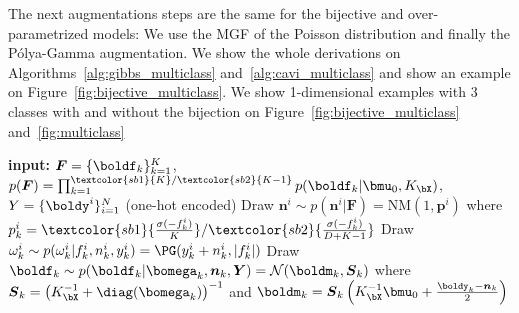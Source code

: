 The next augmentations steps are the same for the bijective and over-parametrized models:
We use the \ac{MGF} of the Poisson distribution and finally the P\'olya-Gamma augmentation.
We show the whole derivations on Algorithms~\ref{alg:gibbs_multiclass} and~\ref{alg:cavi_multiclass} and show an example on Figure~\ref{fig:bijective_multiclass}.
We show 1-dimensional examples with 3 classes with and without the bijection on Figure~\ref{fig:bijective_multiclass} and~\ref{fig:multiclass}
\begin{algorithm}[H]
    \caption{Gibbs sampling updates: $\textcolor{sb1}{K}/\textcolor{sb2}{K - 1}$ latent \acp{GP} for $K$ classes}
    \begin{algorithmic}
    \State \textbf{input:} $\boldsymbol{F} = \{\boldf_k\}_{k=1}^K$, $p(\boldsymbol{F}) = \prod_{k=1}^{\textcolor{sb1}{K}/\textcolor{sb2}{K - 1}} p(\boldf_k|\bmu_0, K_{\bX})$, $Y=\{\boldy^i\}_{i=1}^N$ (one-hot encoded)
        \State Draw $\boldsymbol{n}^i \sim p(\boldsymbol{n}^i|\boldsymbol{F}) = \mathrm{NM}(1, \boldsymbol{p}^i)$ where 
        $p_k^i = \textcolor{sb1}{\frac{\sigma(-f_k^i)}{K}}/\textcolor{sb2}{\frac{\sigma(-f_k^i)}{D + K - 1}}$
        \State Draw $\omega_k^i \sim p(\omega_k^i|f_k^i, n_k^i, y_k^i) = \PG(y_k^i + n^i_k, |f_k^i|)$
        \State Draw $\boldf_k \sim p(\boldf_k|\bomega_k,\boldsymbol{n}_k, \boldsymbol{Y}) = \mathcal{N}(\boldm_k, \boldsymbol{S}_k)$
        \State where $\boldsymbol{S}_k = \left(K_{\bX}^{-1} + \diag(\bomega_k)\right)^{-1}$ and $\boldm_k = \boldsymbol{S}_k\left(K^{-1}_{\bX}\bmu_0 + \frac{\boldy_k - \boldsymbol{n}_k}{2}\right)$
    \EndFor
    \end{algorithmic}
    \label{alg:gibbs_multiclass}
\end{algorithm}

